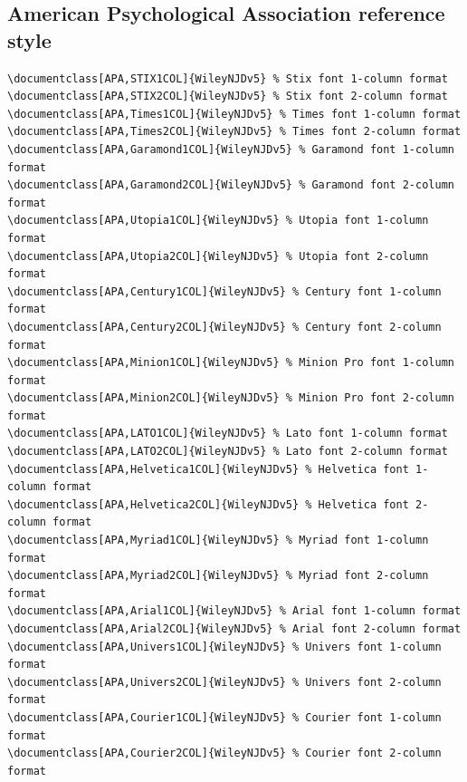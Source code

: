 \documentclass[11pt]{article}
\begin{document}
\subsection*{American Psychological Association reference style}
{\fontsize{9}{10}\selectfont\begin{verbatim}
\documentclass[APA,STIX1COL]{WileyNJDv5} % Stix font 1-column format
\documentclass[APA,STIX2COL]{WileyNJDv5} % Stix font 2-column format
\documentclass[APA,Times1COL]{WileyNJDv5} % Times font 1-column format
\documentclass[APA,Times2COL]{WileyNJDv5} % Times font 2-column format
\documentclass[APA,Garamond1COL]{WileyNJDv5} % Garamond font 1-column format
\documentclass[APA,Garamond2COL]{WileyNJDv5} % Garamond font 2-column format
\documentclass[APA,Utopia1COL]{WileyNJDv5} % Utopia font 1-column format
\documentclass[APA,Utopia2COL]{WileyNJDv5} % Utopia font 2-column format
\documentclass[APA,Century1COL]{WileyNJDv5} % Century font 1-column format
\documentclass[APA,Century2COL]{WileyNJDv5} % Century font 2-column format
\documentclass[APA,Minion1COL]{WileyNJDv5} % Minion Pro font 1-column format
\documentclass[APA,Minion2COL]{WileyNJDv5} % Minion Pro font 2-column format
\documentclass[APA,LATO1COL]{WileyNJDv5} % Lato font 1-column format
\documentclass[APA,LATO2COL]{WileyNJDv5} % Lato font 2-column format
\documentclass[APA,Helvetica1COL]{WileyNJDv5} % Helvetica font 1-column format
\documentclass[APA,Helvetica2COL]{WileyNJDv5} % Helvetica font 2-column format
\documentclass[APA,Myriad1COL]{WileyNJDv5} % Myriad font 1-column format
\documentclass[APA,Myriad2COL]{WileyNJDv5} % Myriad font 2-column format
\documentclass[APA,Arial1COL]{WileyNJDv5} % Arial font 1-column format
\documentclass[APA,Arial2COL]{WileyNJDv5} % Arial font 2-column format
\documentclass[APA,Univers1COL]{WileyNJDv5} % Univers font 1-column format
\documentclass[APA,Univers2COL]{WileyNJDv5} % Univers font 2-column format
\documentclass[APA,Courier1COL]{WileyNJDv5} % Courier font 1-column format
\documentclass[APA,Courier2COL]{WileyNJDv5} % Courier font 2-column format
\end{verbatim}}
\end{document}
